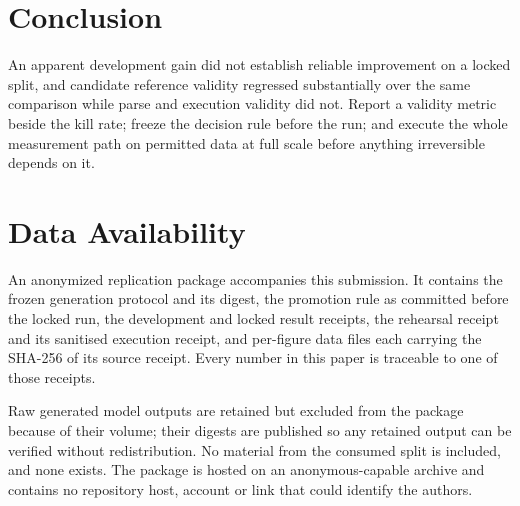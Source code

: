 \documentclass[10pt,conference]{IEEEtran}
\begin{document}
\section{Conclusion}

An apparent development gain did not establish reliable improvement on a locked
split, and candidate reference validity regressed substantially over the same
comparison while parse and execution validity did not. Report a validity metric
beside the kill rate; freeze the decision rule before the run; and execute the
whole measurement path on permitted data at full scale before anything
irreversible depends on it.

\section*{Data Availability}

An anonymized replication package accompanies this submission. It contains the
frozen generation protocol and its digest, the promotion rule as committed
before the locked run, the development and locked result receipts, the rehearsal
receipt and its sanitised execution receipt, and per-figure data files each
carrying the SHA-256 of its source receipt. Every number in this paper is
traceable to one of those receipts.

Raw generated model outputs are retained but excluded from the package because of
their volume; their digests are published so any retained output can be verified
without redistribution. No material from the consumed split is included, and none
exists. The package is hosted on an anonymous-capable archive and contains no
repository host, account or link that could identify the authors.



\end{document}
